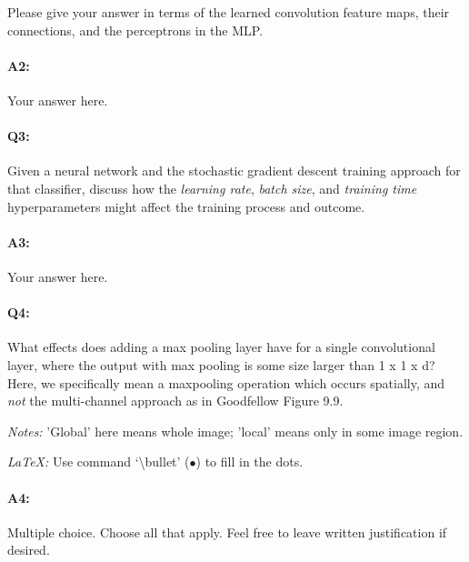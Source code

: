 Please give your answer in terms of the learned convolution feature maps, their connections, and the perceptrons in the MLP.

\paragraph{A2:} Your answer here.




\pagebreak
\paragraph{Q3:} Given a neural network and the stochastic gradient descent training approach for that classifier, discuss how the \emph{learning rate}, \emph{batch size}, and \emph{training time} hyperparameters might affect the training process and outcome.

\paragraph{A3:} Your answer here.



\pagebreak
\paragraph{Q4:} What effects does adding a max pooling layer have for a single convolutional layer, where the output with max pooling is some size larger than 1 x 1 x d? Here, we specifically mean a maxpooling operation which occurs spatially, and \emph{not} the multi-channel approach as in Goodfellow Figure 9.9.

\emph{Notes:} 'Global' here means whole image; 'local' means only in some image region.

\emph{LaTeX:} Use command  `\textbackslash bullet' ($\bullet$) to fill in the dots.

\paragraph{A4:} Multiple choice. Choose all that apply. Feel free to leave written justification if desired.

